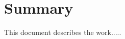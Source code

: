 \cleardoublepage
{}
{}
\begingroup
\let\clearpage\relax
\let\cleardoublepage\relax
\let\cleardoublepage\relax

\chapter*{Summary}

This document describes the work.....



\endgroup

\vfill
